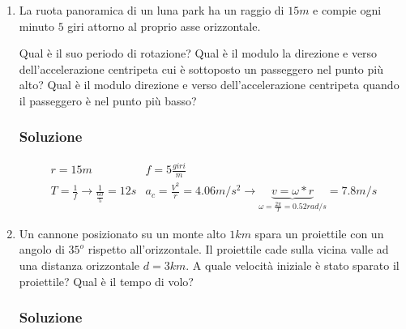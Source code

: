 \documentclass{report}
\begin{document}
\begin{enumerate}
  \item La ruota panoramica di un luna park ha un raggio di $15m$ e compie ogni minuto $5$ giri attorno al proprio asse
    orizzontale.
    \begin{tasks}
      \task Qual è il suo periodo di rotazione?
      \task Qual è il modulo la direzione e verso dell’accelerazione centripeta cui è sottoposto un passeggero nel punto più alto?
      \task Qual è il modulo direzione e verso dell’accelerazione centripeta quando il passeggero è nel punto più basso?
    \end{tasks}
    
\subsubsection{Soluzione}
\label{sec:sol5}
\begin{equation*}
  \begin{matrix}
    r=15m & f=5\frac{giri}{m}\\
    T=\frac{1}{f} \to \frac{1}{\frac{60}{5}}= 12s & a_c=\frac{V^2}{r}= 4.06m/s^2\to \underbrace{v=\omega*r}_{\omega=\frac{2\pi}{T}=0.52rad/s}=7.8m/s 
  \end{matrix}
\end{equation*}
\item Un cannone posizionato su un monte alto $1km$ spara un proiettile con un angolo di $35^o$ rispetto all’orizzontale. Il proiettile cade sulla vicina valle ad una distanza orizzontale $d=3km$. A quale velocità iniziale è stato sparato il proiettile? Qual è il tempo di volo?

\subsubsection{Soluzione}
\label{sec:sol6}


\end{enumerate}
\end{document}
